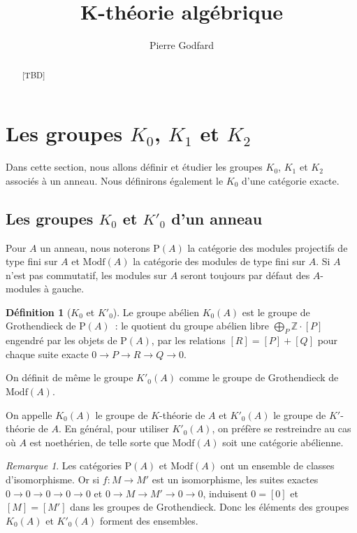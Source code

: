 \documentclass{amsart}
\title{K-théorie algébrique}
\author{Pierre Godfard}
\date{}
\theoremstyle{plain}
\theoremstyle{definition}
\newtheorem{defi}[theo]{Définition}
\theoremstyle{remark}
\newtheorem{rem}[theo]{Remarque}
\newcommand{\ensemblenombre }[1]{\mathbb{#1}}
\newcommand{\Z}{\ensemblenombre{Z}}
\newcommand{\Proj}[1]{\mathrm{P}({#1})}
\newcommand{\Modf}[1]{\mathrm{Modf}({#1})}
\newcommand{\ra}{\rightarrow}
\newcommand{\exa}[3]{0\ra {#1}\ra {#2}\ra {#3}\ra 0}
\begin{document}
\renewcommand{\abstractname}{Introduction}
\begin{abstract}
  [TBD]
\end{abstract}

\maketitle

\tableofcontents

\section{\texorpdfstring{Les groupes $K_0$, $K_1$ et $K_2$}{Les groupes KO, K1 et K2}}\label{sectionK0}

Dans cette section, nous allons définir et étudier les groupes $K_0$, $K_1$ et $K_2$ associés à un anneau. Nous définirons également le $K_0$ d'une catégorie exacte.

\subsection{\texorpdfstring{Les groupes $K_0$  et $K'_0$ d'un anneau}{Les groupes K0  et K'0 d'un anneau}}

Pour $A$ un anneau, nous noterons $\Proj{A}$ la catégorie des modules projectifs de type fini sur $A$ et $\Modf{A}$ la catégorie des modules de type fini sur $A$.
Si $A$ n'est pas commutatif, les modules sur $A$ seront toujours par défaut des $A$-modules à gauche.

\begin{defi}[$K_0$  et $K'_0$]
  Le groupe abélien $K_0(A)$ est le groupe de Grothendieck de $\Proj{A}$~: le quotient du groupe abélien libre $\bigoplus_P \Z\cdot [P]$ engendré par les objets de $\Proj{A}$,
  par les relations $[R] = [P] + [Q]$ pour chaque suite exacte $0\ra P\ra R\ra Q\ra 0$.

  On définit de même le groupe $K'_0(A)$ comme le groupe de Grothendieck de $\Modf{A}$.
\end{defi}

On appelle $K_0(A)$ le groupe de $K$-théorie de $A$ et $K'_0(A)$ le groupe de $K'$-théorie de $A$. En général, pour utiliser $K'_0(A)$,
on préfère se restreindre au cas où $A$ est noethérien, de telle sorte que $\Modf{A}$ soit une catégorie abélienne.

\begin{rem}
  Les catégories $\Proj{A}$ et $\Modf{A}$ ont un ensemble de classes d'isomorphisme. Or si $f:M\ra M'$ est un isomorphisme, les suites exactes $\exa{0}{0}{0}$ et $\exa{M}{M'}{0}$,
  induisent $0=[0]$ et $[M]=[M']$ dans les groupes de Grothendieck. Donc les éléments des groupes $K_0(A)$  et $K'_0(A)$ forment des ensembles.
\end{rem}
\end{document}
